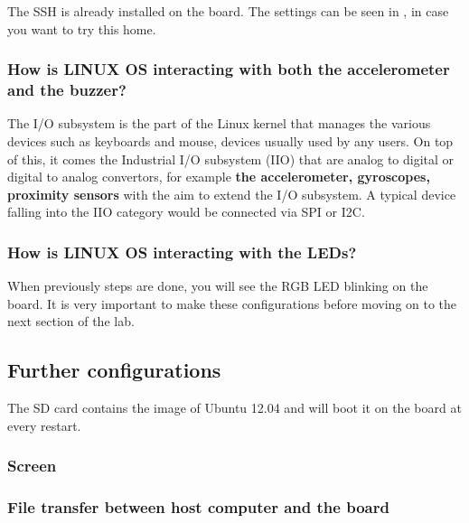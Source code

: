 The SSH is already installed on the board. The settings can be seen in  , in case you want to try this home.














\subsubsection{How is LINUX OS interacting with both the accelerometer and the buzzer?}

The I/O subsystem is the part of the Linux kernel that manages the various devices such as keyboards and mouse, devices usually used by any users. On top of this, it comes the Industrial I/O subsystem (IIO) that are analog to digital or digital to analog convertors, for example \textbf{the accelerometer, gyroscopes, proximity sensors} with the aim to extend the I/O subsystem. A typical device falling into the IIO category would be connected via SPI or I2C.






\subsubsection{How is LINUX OS interacting with the LEDs?}




When previously steps are done, you will see the RGB LED blinking on the board. It is very
important to make these configurations before moving on to the next section of the lab.

\subsection{Further configurations}

The SD card contains the image of Ubuntu 12.04 and will boot it on the board at every restart.

\subsubsection{Screen}

\subsubsection{File transfer between host computer and the board}

